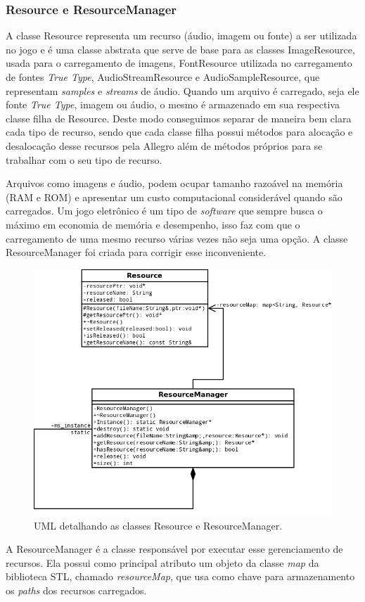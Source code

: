 \subsubsection{Resource e ResourceManager}
%
A classe Resource representa um recurso (áudio, imagem ou fonte) a ser utilizada no jogo e é uma classe abstrata que serve de base para as classes ImageResource, usada para o carregamento de imagens, FontResource utilizada no carregamento de fontes \textit{True Type}, AudioStreamResource e AudioSampleResource, que representam \textit{samples} e \textit{streams} de áudio. Quando um arquivo é carregado, seja ele fonte \textit{True Type}, imagem ou áudio, o mesmo é armazenado em sua respectiva classe filha de Resource. Deste modo conseguimos separar de maneira bem clara cada tipo de recurso, sendo que cada classe filha possui métodos para alocação e desalocação desse recursos pela Allegro além de métodos próprios para se trabalhar com o seu tipo de recurso. 
%
\par
Arquivos como imagens e áudio, podem ocupar tamanho razoável na memória (RAM e ROM) e apresentar um custo computacional considerável quando são carregados. Um jogo eletrônico é um tipo de \textit{software} que sempre busca o máximo em economia de memória e desempenho, isso faz com que o carregamento de uma mesmo recurso várias vezes não seja uma opção. A classe ResourceManager foi criada para corrigir esse inconveniente.
%
%
\begin{figure}[h]
    \centering
		\caption{UML detalhando as classes Resource e ResourceManager.}
    \label{ResourceManager}
    \includegraphics[scale = 0.4]{uml/ResourceManager.png}
\end{figure}
%
%
\par 
A ResourceManager é a classe responsável por executar esse gerenciamento de recursos. Ela possui como principal atributo um objeto da classe \textit{map} da biblioteca STL, chamado \textit{resourceMap}, que usa como chave para armazenamento os \textit{paths} dos recursos carregados.

